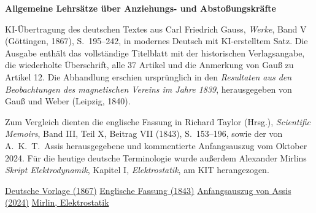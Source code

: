 \clearpage
\thispagestyle{empty}
\begin{center}\Large\textbf{Allgemeine Lehrsätze über Anziehungs- und Abstoßungskräfte}\end{center}

KI-Übertragung des deutschen Textes aus Carl Friedrich Gauss, \textit{Werke}, Band V (Göttingen, 1867), S.~195--242, in modernes Deutsch mit KI-erstelltem Satz. Die Ausgabe enthält das vollständige Titelblatt mit der historischen Verlagsangabe, die wiederholte Überschrift, alle 37 Artikel und die Anmerkung von Gauß zu Artikel 12. Die Abhandlung erschien ursprünglich in den \textit{Resultaten aus den Beobachtungen des magnetischen Vereins im Jahre 1839}, herausgegeben von Gauß und Weber (Leipzig, 1840).

Zum Vergleich dienten die englische Fassung in Richard Taylor (Hrsg.), \textit{Scientific Memoirs}, Band III, Teil X, Beitrag VII (1843), S.~153--196, sowie der von A.~K.~T.~Assis herausgegebene und kommentierte Anfangsauszug vom Oktober 2024. Für die heutige deutsche Terminologie wurde außerdem Alexander Mirlins \textit{Skript Elektrodynamik}, Kapitel I, \textit{Elektrostatik}, am KIT herangezogen.

\noindent\href{https://gdz.sub.uni-goettingen.de/id/PPN236006339}{Deutsche Vorlage (1867)}\quad
\href{https://archive.org/details/scientificmemoir03memo/page/153/mode/1up}{Englische Fassung (1843)}\quad
\href{https://www.ifi.unicamp.br/~assis/Gauss-1840.pdf}{Anfangsauszug von Assis (2024)}\quad
\href{https://www.tkm.kit.edu/downloads/ws2012_theoc/Kapitel-I-Elektrostatik.pdf}{Mirlin, Elektrostatik}
\clearpage

